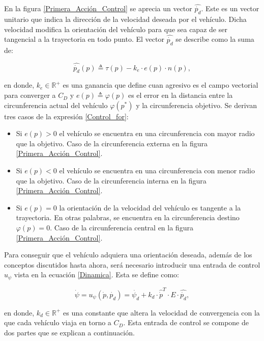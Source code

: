 En la figura \ref{Primera_Acción_Control} se aprecia un vector $\hat{\dot{p_d}}$. Este es un vector unitario que indica la dirección de la velocidad deseada por el vehículo. Dicha velocidad modifica la orientación del vehículo para que sea capaz de ser tangencial a la trayectoria en todo punto. El vector $\hat{\dot{p_d}}$ se describe como la suma de:

\begin{equation} \label{Control_for}
	\hat{\dot{p_{d}}}\left(p\right)\triangleq\tau\left(p\right)-k_{e}\cdot{e\left(p\right)}\cdot{n\left(p\right)},
\end{equation}

en donde, $k_{e}\in\mathbb{R}^{+}$ es una ganancia que define cuan agresivo es el campo vectorial para converger a $C_D$ y $e\left(p\right)\triangleq\varphi\left(p\right)$ es el error en la distancia entre la circunferencia actual del vehículo $\varphi\left(p^*\right)$ y la circunferencia objetivo. Se derivan tres casos de la expresión \ref{Control_for}:

\begin{itemize}
	\item Si $e\left(p\right)>0$ el vehículo se encuentra en una circunferencia con mayor radio que la objetivo. Caso de la circunferencia externa en la figura \ref{Primera_Acción_Control}.\newpage
	\item Si $e\left(p\right)<0$ el vehículo se encuentra en una circunferencia con menor radio que la objetivo. Caso de la circunferencia interna en la figura \ref{Primera_Acción_Control}.
	\item Si $e\left(p\right)=0$ la orientación de la velocidad del vehículo es tangente a la trayectoria. En otras palabras, se encuentra en la circunferencia destino $\varphi\left(p\right)=0$. Caso de la circunferencia central en la figura \ref{Primera_Acción_Control}.
\end{itemize}

Para conseguir que el vehículo adquiera una orientación deseada, además de los conceptos discutidos hasta ahora, será necesario introducir una entrada de control $u_{\psi}$ vista en la ecuación \ref{Dinamica}. Esta se define como:

\begin{equation} \label{Action_Control}
	\dot{\psi}={u_{\psi}}\left(\dot{p},\dot{p_{d}}\right)=\dot{\psi_{d}}+k_{d}\cdot{\hat{\dot{p}}^{T}}\cdot{E}\cdot{\hat{\dot{p_{d}}}},
\end{equation}

en donde, $k_{d}\in\mathbb{R}^{+}$ es una constante que altera la velocidad de convergencia con la que cada vehículo viaja en torno a $C_D$. Esta entrada de control se compone de dos partes que se explican a continuación.

